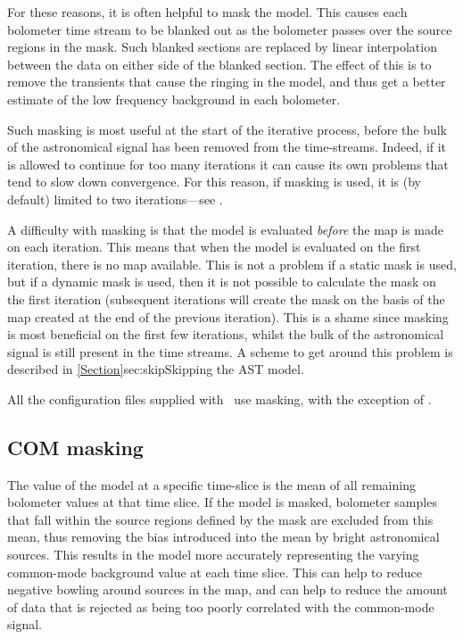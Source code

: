 For these reasons, it is often helpful to mask the  model.
This causes each bolometer time stream to be blanked out as the
bolometer passes over the source regions in the mask. Such blanked
sections are replaced by linear interpolation between the data on either
side of the blanked section. The effect of this is to remove the
transients that cause the ringing in the  model, and thus get
a better estimate of the low frequency background in each bolometer.

Such masking is most useful at the start of the iterative process,
before the bulk of the astronomical signal has been removed from the
time-streams. Indeed, if it is allowed to continue for too many iterations
it can cause its own problems that tend to slow down convergence. For
this reason, if  masking is used, it is (by default) limited
to two iterations---see .

A difficulty with  masking is that the  model is
evaluated \emph{before} the map is made on each iteration. This means
that when the  model is evaluated on the first iteration,
there is no map available. This is not a problem if a static mask is
used, but if a dynamic mask is used, then it is not possible to calculate
the  mask on the first iteration (subsequent iterations will
create the mask on the basis of the map created at the end of the
previous iteration). This is a shame since  masking is most
beneficial on the first few iterations, whilst the bulk of the astronomical
signal is still present in the time streams. A scheme to get around this
problem is described in \cref{Section}{sec:skip}{Skipping the AST model}.

All the configuration files supplied with \smurf\ use 
masking, with the exception of \blankfield.

\subsection{COM masking}
\label{sec:commask}

The value of the  model at a specific time-slice is the mean
of all remaining bolometer values at that time slice. If the 
model is masked, bolometer samples that fall within the source regions
defined by the mask are excluded from this mean, thus removing the bias
introduced into the mean by bright astronomical sources. This results in
the  model more accurately representing the varying common-mode
background value at each time slice. This can help to reduce negative
bowling around sources in the map, and can help to reduce the amount of
data that is rejected as being too poorly correlated with the common-mode
signal.

